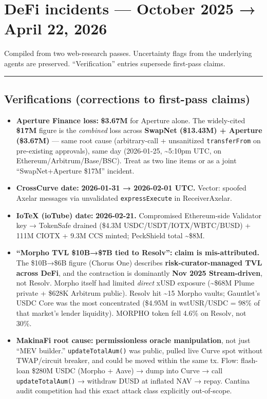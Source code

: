 \section{DeFi incidents --- October 2025 → April 22, 2026}\label{defi-incidents-october-2025-april-22-2026}

Compiled from two web-research passes. Uncertainty flags from the underlying agents are preserved. ``Verification'' entries supersede first-pass claims.

\begin{center}\rule{0.5\linewidth}{0.5pt}\end{center}

\subsection{Verifications (corrections to first-pass claims)}\label{verifications-corrections-to-first-pass-claims}

\begin{itemize}
\tightlist
\item
  \textbf{Aperture Finance loss:} \textbf{\$3.67M} for Aperture alone. The widely-cited \textbf{\$17M} figure is the \emph{combined} loss across \textbf{SwapNet (\$13.43M) + Aperture (\$3.67M)} --- same root cause (arbitrary-call + unsanitized \texttt{transferFrom} on pre-existing approvals), same day (2026-01-25, \textasciitilde5:10pm UTC, on Ethereum/Arbitrum/Base/BSC). Treat as two line items or as a joint ``SwapNet+Aperture \$17M'' incident.
\item
  \textbf{CrossCurve date:} \textbf{2026-01-31 → 2026-02-01 UTC.} Vector: spoofed Axelar messages via unvalidated \texttt{expressExecute} in ReceiverAxelar.
\item
  \textbf{IoTeX (ioTube) date:} \textbf{2026-02-21.} Compromised Ethereum-side Validator key → TokenSafe drained (\$4.3M USDC/USDT/IOTX/WBTC/BUSD) + 111M CIOTX + 9.3M CCS minted; PeckShield total \textasciitilde\$8M.
\item
  \textbf{``Morpho TVL \$10B→\$7B tied to Resolv'':} \textbf{claim is mis-attributed.} The \$10B→\$6B figure (Chorus One) describes \textbf{risk-curator-managed TVL across DeFi}, and the contraction is dominantly \textbf{Nov 2025 Stream-driven}, not Resolv. Morpho itself had limited \emph{direct} xUSD exposure (\textasciitilde\$68M Plume private + \$628K Arbitrum public). Resolv hit \textasciitilde15 Morpho vaults; Gauntlet's USDC Core was the most concentrated (\$4.95M in wstUSR/USDC = 98\% of that market's lender liquidity). MORPHO token fell 4.6\% on Resolv, not 30\%.
\item
  \textbf{MakinaFi root cause:} \textbf{permissionless oracle manipulation}, not just ``MEV builder.'' \texttt{updateTotalAum()} was public, pulled live Curve spot without TWAP/circuit breaker, and could be moved within the same tx. Flow: flash-loan \$280M USDC (Morpho + Aave) → dump into Curve → call \texttt{updateTotalAum()} → withdraw DUSD at inflated NAV → repay. Cantina audit competition had this exact attack class explicitly out-of-scope.
\end{itemize}

